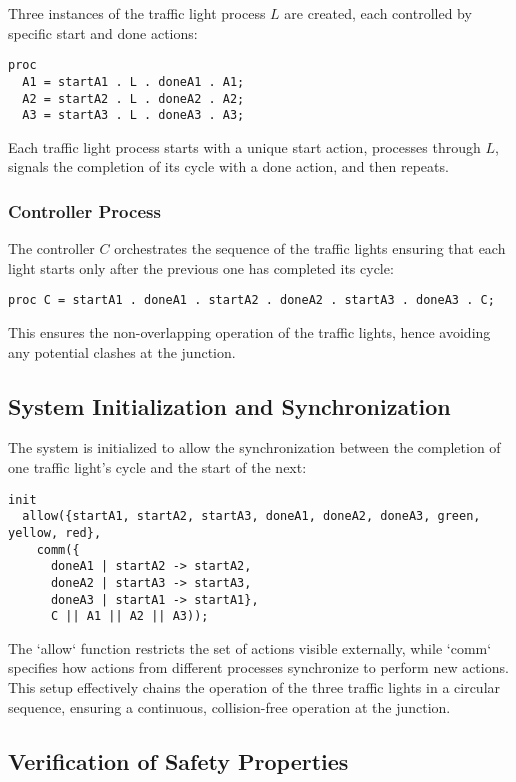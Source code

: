 \documentclass{article}
\begin{document}
Three instances of the traffic light process \( L \) are created, each controlled by specific start and done actions:
\begin{lstlisting}
proc
  A1 = startA1 . L . doneA1 . A1;
  A2 = startA2 . L . doneA2 . A2;
  A3 = startA3 . L . doneA3 . A3;
\end{lstlisting}

Each traffic light process starts with a unique start action, processes through \( L \), signals the completion of its cycle with a done action, and then repeats.

\subsubsection{Controller Process}

The controller \( C \) orchestrates the sequence of the traffic lights ensuring that each light starts only after the previous one has completed its cycle:
\begin{lstlisting}
proc C = startA1 . doneA1 . startA2 . doneA2 . startA3 . doneA3 . C;
\end{lstlisting}

This ensures the non-overlapping operation of the traffic lights, hence avoiding any potential clashes at the junction.

\subsection{System Initialization and Synchronization}

The system is initialized to allow the synchronization between the completion of one traffic light's cycle and the start of the next:
\begin{lstlisting}
init
  allow({startA1, startA2, startA3, doneA1, doneA2, doneA3, green, yellow, red},
    comm({
      doneA1 | startA2 -> startA2,
      doneA2 | startA3 -> startA3,
      doneA3 | startA1 -> startA1},
      C || A1 || A2 || A3));
\end{lstlisting}

The `allow` function restricts the set of actions visible externally, while `comm` specifies how actions from different processes synchronize to perform new actions. This setup effectively chains the operation of the three traffic lights in a circular sequence, ensuring a continuous, collision-free operation at the junction.



\subsection{Verification of Safety Properties}
\end{document}
